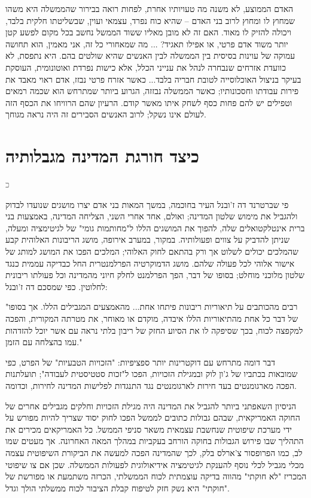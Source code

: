 \documentclass[12pt,oneside]{book}
\newcommand{\hebrewchapter}[2]{%
  \chapter*{#1}%
  \addcontentsline{toc}{chapter}{#1}%
  \lettrine[lines=4, lhang=0.1, loversize=0.5, findent=0pt]{\textcolor{gray} #2}{}%
}
\begin{document}
\begin{quoting}
האדם הממוצע, לא משנה מה טעויותיו אחרת, לפחות רואה בבירור שהממשלה היא משהו שמחוץ לו ומחוץ לרוב בני האדם – שהיא כוח נפרד, עצמאי ועוין, שבשליטתו חלקית בלבד, ויכולה להזיק לו מאוד. האם זה לא מובן מאליו ששוד הממשל נחשב בכל מקום לפשע קטן יותר משוד אדם פרטי, או אפילו תאגיד? ... מה שמאחורי כל זה, אני מאמין, הוא תחושה עמוקה של עוינות בסיסית בין הממשלה לבין האנשים שהיא שולטים בהם. היא נתפסת, לא כוועדת אזרחים שנבחרה לנהל את ענייני הכלל, אלא כישות נפרדת ואוטונומית, העוסקת בעיקר בניצול האוכלוסייה לטובת חבריה בלבד... כאשר אזרח פרטי נבזז, אדם ראוי מאבד את פירות עבודתו וחסכונותיו; כאשר הממשלה נבזזה, הגרוע ביותר שמתרחש הוא שכמה רמאים וטפילים יש להם פחות כסף לשחק איתו מאשר קודם. הרעיון שהם הרוויחו את הכסף הזה לעולם אינו נשקל; לרוב האנשים הסבירים זה היה נראה מגוחך.
\end{quoting}

\hebrewchapter{כיצד חורגת המדינה מגבלותיה}{כ}
פי שברטרנד דה ז'ובנל העיר בחוכמה, במשך המאות בני אדם יצרו מושגים שנועדו לבדוק ולהגביל את מימוש שלטון המדינה; ואולם, אחד אחרי השני, הצליחה המדינה, באמצעות בני ברית אינטלקטואלים שלה, להפוך את המושגים הללו ל"מחותמות גומי" של לגיטימציה ומעלה, שניתן להדביק על צווים ופעולותיה. במקור, במערב אירופה, מושג הריבונות האלוהית קבע שהמלכים יכולים לשלוט אך ורק בהתאם לחוק האלוהי; המלכים הפכו את המושג למותג של אישור אלוהי לכל פעולה שלהם. מושג הדמוקרטיה הפרלמנטרית החל כבדיקה עממית כנגד שלטון מלוכני מוחלט; בסופו של דבר, הפך הפרלמנט לחלק חיוני מהמדינה וכל פעולתו ריבונית לחלוטין. כפי שמסכם דה ז'ובנל:

\begin{quoting}
"רבים מהכותבים על תיאוריות ריבונות פיתחו אחת... מהאמצעים המגבילים הללו. אך בסופו של דבר כל אחת מהתיאוריות הללו איבדה, מוקדם או מאוחר, את מטרתה המקורית, והפכה למקפצה לכוח, בכך שסיפקה לו את הסיוע החזק של ריבון בלתי נראה עם אשר יוכל להזדהות עמו בהצלחה עם הזמן."
\end{quoting}

דבר דומה מתרחש עם דוקטרינות יותר ספציפיות: "הזכויות הטבעיות" של הפרט, כפי שמובאות בכתביו של ג'ון לוק ובמגילת הזכויות, הפכו ל"זכות סטטיסטית לעבודה"; תועלתנות הפכה מארגומנטים בעד חירות לארגומנטים נגד התנגדות לפלישות המדינה לחירות, וכדומה.

הניסיון השאפתני ביותר להגביל את המדינה היה מגילת הזכויות וחלקים מגבילים אחרים של החוקה האמריקאית, שבהם גבולות כתובים לממשל הפכו לחוק יסוד שצריך להיות מפורש על ידי מערכת שיפוטית שנחשבת עצמאית משאר סניפי הממשל. כל האמריקאים מכירים את התהליך שבו פירוש הגבולות בחוקה הורחב בעקביות במהלך המאה האחרונה. אך מעטים שמו לב, כמו הפרופסור צ'ארלס בלק, לכך שהמדינה הפכה למעשה את הביקורת השיפוטית עצמה מכלי מגביל לכלי נוסף להענקת לגיטימציה אידיאולוגית לפעולות הממשלה. שכן אם צו שיפוטי המכריז "לא חוקתי" מהווה בדיקה עוצמתית לכוח הממשלתי, הכרזה משתמעת או מפורשת של "חוקתי" היא נשק חזק לטיפוח קבלת הציבור לכוח ממשלתי הולך וגדל.
\end{document}

